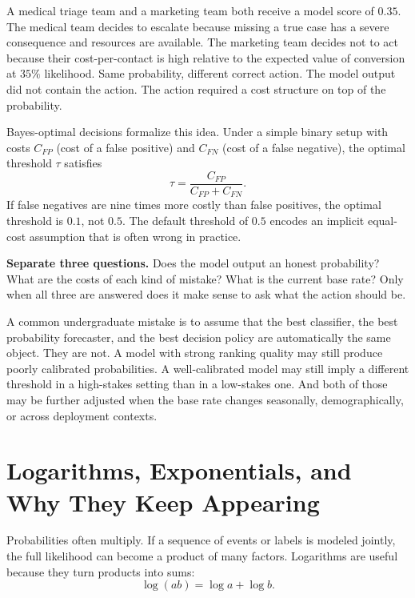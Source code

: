 \begin{example}
A medical triage team and a marketing team both receive a model score of $0.35$. The medical team decides to escalate because missing a true case has a severe consequence and resources are available. The marketing team decides not to act because their cost-per-contact is high relative to the expected value of conversion at $35\%$ likelihood. Same probability, different correct action. The model output did not contain the action. The action required a cost structure on top of the probability.
\end{example}

Bayes-optimal decisions formalize this idea. Under a simple binary setup with costs $C_{FP}$ (cost of a false positive) and $C_{FN}$ (cost of a false negative), the optimal threshold $\tau$ satisfies
\[
\tau = \frac{C_{FP}}{C_{FP} + C_{FN}}.
\]
If false negatives are nine times more costly than false positives, the optimal threshold is $0.1$, not $0.5$. The default threshold of $0.5$ encodes an implicit equal-cost assumption that is often wrong in practice.

\begin{thinkingtool}
\textbf{Separate three questions.} Does the model output an honest probability? What are the costs of each kind of mistake? What is the current base rate? Only when all three are answered does it make sense to ask what the action should be.
\end{thinkingtool}

A common undergraduate mistake is to assume that the best classifier, the best probability forecaster, and the best decision policy are automatically the same object. They are not. A model with strong ranking quality may still produce poorly calibrated probabilities. A well-calibrated model may still imply a different threshold in a high-stakes setting than in a low-stakes one. And both of those may be further adjusted when the base rate changes seasonally, demographically, or across deployment contexts.

\section*{Logarithms, Exponentials, and Why They Keep Appearing}

Probabilities often multiply. If a sequence of events or labels is modeled jointly, the full likelihood can become a product of many factors. Logarithms are useful because they turn products into sums:
\[
\log(ab) = \log a + \log b.
\]


